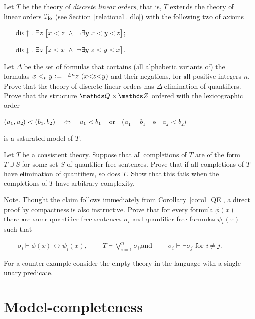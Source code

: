 \begin{exercise}\label{ex_discrete_lo}
Let $T$ be the theory of \emph{discrete linear orders}, that is, $T$ extends the theory of linear orders $T_{\rm lo}$  (see Section~\hyperref[dlo]{\ref*{relational}.\ref*{dlo}}) with the following two of axioms
\begin{itemize}
\item[dis$\uparrow$.] $\E z\ \big[x<z\ \wedge\ \neg\E y\ x<y<z\big]$;
\item[dis$\downarrow$.] $\E z\ \big[ z<x\ \wedge\ \neg\E y\ z<y<x\big]$.
\end{itemize}
Let $\Delta$ be the set of formulas that contains (all alphabetic variants of) the formulas $x<_ny:=\E^{\ge n}z\ (x\mathord<z\mathord< y)$ and their negations, for all positive integers $n$. Prove that the theory of discrete linear orders has $\Delta$-elimination of quantifiers. Prove that the structure $\QQ\times\ZZ$ ordered with the lexicographic order 

\hfil$(a_1,a_2)<(b_1,b_2)\quad\Leftrightarrow\quad a_1<b_1$\ \ or\ \ ($a_1=b_1$\ \ e\ \ $a_2<b_2$)

is a saturated model of $T$.\QED
\end{exercise}



\begin{exercise}
Let $T$ be a consistent theory. Suppose that all completions of $T$ are of the form 
$T\cup S$ for some set $S$ of quantifier-free sentences. Prove that if all completions of $T$ have elimination of quantifiers, so does $T$. Show that this fails when the completions of $T$ have arbitrary complexity. 

Note. Thought the claim follows immediately from Corollary~\ref{corol_QE}, a direct proof by compactness is also instructive. Prove that for every formula $\phi(x)$ there are some quantifier-free sentences $\sigma_i$ and quantifier-free formulas $\psi_i(x)$ such that

$\displaystyle\qquad\sigma_i\vdash\phi(x)\leftrightarrow\psi_i(x)$, 
$\qquad\displaystyle T\vdash\bigvee^n_{i=1}\sigma_i$,\qquad and  $\qquad\sigma_i\vdash\neg\sigma_j$ for $i\neq j$.

For a counter example consider the empty theory in the language with a single unary predicate.\QED
\end{exercise}


\section{Model-completeness}

